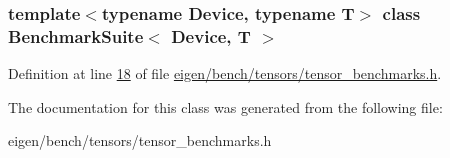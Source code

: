 \subsubsection*{template$<$typename Device, typename T$>$\newline
class Benchmark\+Suite$<$ Device, T $>$}



Definition at line \hyperlink{eigen_2bench_2tensors_2tensor__benchmarks_8h_source_l00018}{18} of file \hyperlink{eigen_2bench_2tensors_2tensor__benchmarks_8h_source}{eigen/bench/tensors/tensor\+\_\+benchmarks.\+h}.



The documentation for this class was generated from the following file\+:\begin{DoxyCompactItemize}
\item 
eigen/bench/tensors/tensor\+\_\+benchmarks.\+h\end{DoxyCompactItemize}

